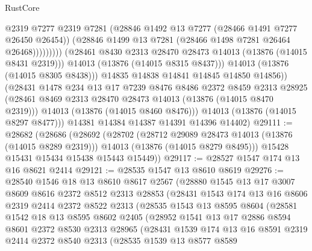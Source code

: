 \begin{lexlean}{RustCore}
\begin{coremodule}
                              @2319
                              @7277
                              @2319
                              @7281
                              (@28846 @1492 @13 @7277 (@28466 @1491 @7277 @26450 @26454))
                              (@28846 @1499 @13 @7281 (@28466 @1498 @7281 @26464 @26468)))))))))
                (@28461 @8430 @2313 @28470 @28473 @14013 (@13876 (@14015 @8431 @2319)))
                @14013
                (@13876 (@14015 @8315 @8437)))
              @14013
              (@13876 (@14015 @8305 @8438)))
            @14835
            @14838
            @14841
            @14845
            @14850
            @14856))
        (@28431
          @1478
          @234
          @13
          @17
          @7239
          @8476
          @8486
          @2372
          @8459
          @2313
          @28925
          (@28461 @8469 @2313 @28470 @28473 @14013 (@13876 (@14015 @8470 @2319)))
          @14013
          (@13876 (@14015 @8460 @8476)))
        @14013
        (@13876 (@14015 @8297 @8477)))
      @14381
      @14384
      @14387
      @14391
      @14396
      @14402)
@29111 := @28682
    (@28686
      (@28692
        (@28702
          (@28712 @29089 @28473 @14013 (@13876 (@14015 @8289 @2319)))
          @14013
          (@13876 (@14015 @8279 @8495)))
        @15428
        @15431
        @15434
        @15438
        @15443
        @15449))
@29117 := @28527 @1547 @174 @13 @16 @8621 @2414
@29121 := @28535 @1547 @13 @8610 @8619
@29276 := @28540
    @1546
    @18
    @13
    @8610
    @8617
    @2567
    (@28880
      @1545
      @13
      @17
      @3007
      @8609
      @8616
      @2372
      @8512
      @2313
      @28853
      (@28431
        @1543
        @174
        @13
        @16
        @8606
        @2319
        @2414
        @2372
        @8522
        @2313
        (@28535
          @1543
          @13
          @8595
          @8604
          (@28581
            @1542
            @18
            @13
            @8595
            @8602
            @2405
            (@28952
              @1541
              @13
              @17
              @2886
              @8594
              @8601
              @2372
              @8530
              @2313
              @28965
              (@28431
                @1539
                @174
                @13
                @16
                @8591
                @2319
                @2414
                @2372
                @8540
                @2313
                (@28535
                  @1539
                  @13
                  @8577
                  @8589

\end{coremodule}
\end{lexlean}
